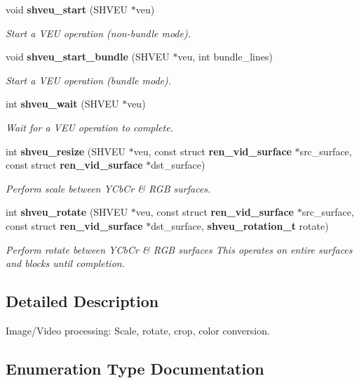 \begin{DoxyCompactItemize}
void {\bf shveu\_\-start} (SHVEU $\ast$veu)
\begin{DoxyCompactList}\small\item\em Start a VEU operation (non-\/bundle mode). \item\end{DoxyCompactList}\item 
void {\bf shveu\_\-start\_\-bundle} (SHVEU $\ast$veu, int bundle\_\-lines)
\begin{DoxyCompactList}\small\item\em Start a VEU operation (bundle mode). \item\end{DoxyCompactList}\item 
int {\bf shveu\_\-wait} (SHVEU $\ast$veu)
\begin{DoxyCompactList}\small\item\em Wait for a VEU operation to complete. \item\end{DoxyCompactList}\item 
int {\bf shveu\_\-resize} (SHVEU $\ast$veu, const struct {\bf ren\_\-vid\_\-surface} $\ast$src\_\-surface, const struct {\bf ren\_\-vid\_\-surface} $\ast$dst\_\-surface)
\begin{DoxyCompactList}\small\item\em Perform scale between YCbCr \& RGB surfaces. \item\end{DoxyCompactList}\item 
int {\bf shveu\_\-rotate} (SHVEU $\ast$veu, const struct {\bf ren\_\-vid\_\-surface} $\ast$src\_\-surface, const struct {\bf ren\_\-vid\_\-surface} $\ast$dst\_\-surface, {\bf shveu\_\-rotation\_\-t} rotate)
\begin{DoxyCompactList}\small\item\em Perform rotate between YCbCr \& RGB surfaces This operates on entire surfaces and blocks until completion. \item\end{DoxyCompactList}\end{DoxyCompactItemize}


\subsection{Detailed Description}
Image/Video processing: Scale, rotate, crop, color conversion. 

\subsection{Enumeration Type Documentation}
